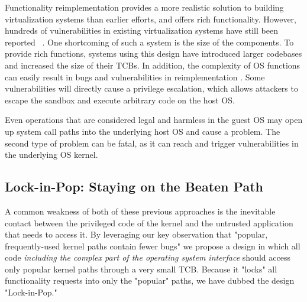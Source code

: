 Functionality reimplementation provides a more realistic solution to building
virtualization systems than earlier efforts, and offers rich functionality.
However, hundreds of vulnerabilities in existing virtualization systems have still been
reported ~\cite{NVD}. One shortcoming of such a system is the size
of the components. To provide rich functions, systems using this design have
introduced larger codebases and increased the size of their TCBs. In addition, the
complexity of OS functions can easily result in bugs and vulnerabilities in
reimplementation . Some vulnerabilities
will directly cause a privilege escalation, which allows attackers to escape the sandbox
and execute arbitrary code on the host OS.


Even operations that are considered
legal and harmless in the guest OS may open up system call paths into the underlying
host OS and cause a problem.
The second type of problem can be fatal,
as it can reach and trigger vulnerabilities in the underlying OS kernel.


\subsection{Lock-in-Pop: Staying on the Beaten Path }
A common weakness of both of these previous approaches is the inevitable contact
between the privileged code of the kernel and the untrusted application
that needs to access it. By leveraging our key observation
 that "popular, frequently-used kernel paths contain fewer bugs" we propose a design
in which all code \emph{including the complex part
of the operating system interface} should access only
popular kernel paths through a very small TCB. Because it "locks" all functionality
 requests into only the "popular" paths, we have dubbed the
design "Lock-in-Pop."

